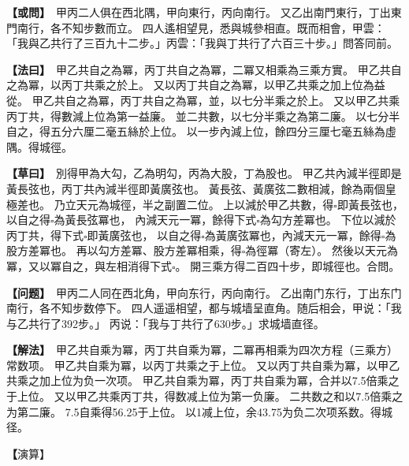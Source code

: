 \documentclass[11pt,a4paper]{article}
\let\origsquare\square
\renewcommand{\square}{\ensuremath{\origsquare}}%
\newcommand{\clOWEN}[1]{%
  \par\vspace{0.3em}%
  \noindent\textcolor{problemcolor}{\textbf{【或問】}}\,{\tradfont #1}\par\nopagebreak%
}
\newcommand{\mdOWEN}[1]{%
  \par\vspace{0.3em}%
  \noindent\textcolor{problemcolor}{\textbf{【问题】}}\,{\modfont #1}\par\nopagebreak%
}
\newcommand{\clFAYUE}[1]{%
  \par\noindent\textcolor{methodcolor}{\textbf{【法曰】}}\,{\tradfont #1}\par\nopagebreak%
}
\newcommand{\mdFAYUE}[1]{%
  \par\noindent\textcolor{methodcolor}{\textbf{【解法】}}\,{\modfont #1}\par\nopagebreak%
}
\newcommand{\clTSAOYUE}[1]{%
  \par\noindent\textcolor{workcolor}{\textbf{【草曰】}}\,{\tradfont #1}\par%
}
\newcommand{\mdTSAOYUE}[1]{%
  \par\noindent\textcolor{workcolor}{\textbf【演算】}}\,{\modfont #1}\par%
\begin{document}
\begin{paracol}{2}

\begin{leftcolumn}
\clOWEN{%
甲丙二人俱在西北隅，甲向東行，丙向南行。
又乙出南門東行，丁出東門南行，各不知步數而立。
四人遙相望見，悉與城參相直。既而相會，甲雲：
「我與乙共行了三百九十二步。」丙雲：「我與丁共行了六百三十步。」問答同前。}

\clFAYUE{%
甲乙共自之為冪，丙丁共自之為冪，二冪又相乘為三乘方實。
甲乙共自之為冪，以丙丁共乘之於上。
又以丙丁共自之為冪，以甲乙共乘之加上位為益從。
甲乙共自之為冪，丙丁共自之為冪，並，以七分半乘之於上。
又以甲乙共乘丙丁共，得數減上位為第一益廉。
並二共數，以七分半乘之為第二廉。
以七分半自之，得五分六厘二毫五絲於上位。
以一步內減上位，餘四分三厘七毫五絲為虛隅。得城徑。}

\clTSAOYUE{%
別得甲為大勾，乙為明勾，丙為大股，丁為股也。
甲乙共內減半徑即是黃長弦也，丙丁共內減半徑即黃廣弦也。
黃長弦、黃廣弦二數相減，餘為兩個皇極差也。
乃立天元為城徑，半之副置二位。
上以減於甲乙共數，得$\square$即黃長弦也，以自之得$\square$為黃長弦冪也，
內減天元一冪，餘得下式$\square$為勾方差冪也。
下位以減於丙丁共，得下式$\square$即黃廣弦也，
以自之得$\square$為黃廣弦冪也，內減天元一冪，餘得$\square$為股方差冪也。
再以勾方差冪、股方差冪相乘，得$\square$為徑冪（寄左）。
然後以天元為冪，又以冪自之，與左相消得下式$\square$。
開三乘方得二百四十步，即城徑也。合問。}
\end{leftcolumn}

\switchcolumn

\begin{rightcolumn}
\mdOWEN{%
甲丙二人同在西北角，甲向东行，丙向南行。
乙出南门东行，丁出东门南行，各不知步数停下。
四人遥遥相望，都与城墙呈直角。随后相会，甲说：「我与乙共行了392步。」
丙说：「我与丁共行了630步。」求城墙直径。}

\mdFAYUE{%
甲乙共自乘为冪，丙丁共自乘为冪，二冪再相乘为四次方程（三乘方）常数项。
甲乙共自乘为冪，以丙丁共乘之于上位。
又以丙丁共自乘为冪，以甲乙共乘之加上位为负一次项。
甲乙共自乘为冪，丙丁共自乘为冪，合并以7.5倍乘之于上位。
又以甲乙共乘丙丁共，得数减上位为第一负廉。
二共数之和以7.5倍乘之为第二廉。
7.5自乘得56.25于上位。
以1减上位，余43.75为负二次项系数。得城径。}

\mdTSAOYUE{%
辨识得：甲为大勾，乙为明勾，丙为大股，丁为股。
甲乙共减去半半径即为黄长弦，丙丁共减去半半径即为黄广弦。
黄长弦、黄广弦二数相减，余为两个皇极差。
设天元为城径，取半后分置两位。
上位从甲乙共数中减去，得$\square$即黄长弦，自乘得$\square$为黄长弦冪，
减去天元一冪，余得下式$\square$为勾方差冪。
下位从丙丁共中减去，得下式$\square$即黄广弦，
自乘得$\square$为黄广弦冪，减去天元一冪，余得$\square$为股方差冪。
再以勾方差冪、股方差冪相乘，得$\square$为径冪（寄左）。
然后天元自乘，再自乘（四次方），与左式相消得下式$\square$。
开四次方程（三乘方）得240步，即城径。符合所问。}
\end{rightcolumn}

\end{paracol}
\end{document}
